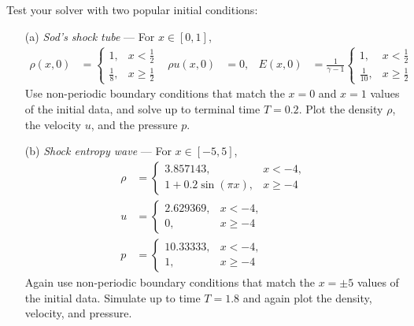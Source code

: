 \documentclass[11pt]{amsart}
\begin{document}
Test your solver with two popular initial conditions:
\begin{itemize}
  \item[(a)] \textit{Sod's shock tube} --- For $x \in [0,1]$,
    {\begin{align*}
      \rho(x,0) &= \left\{ \begin{array}{rl} 1, & x < \frac{1}{2} \\ \frac{1}{8}, & x \geq \frac{1}{2} \end{array}\right. &
        \rho u(x,0) &= 0, &
      E(x,0) &= \frac{1}{\gamma-1}\left\{ \begin{array}{rl} 1, & x < \frac{1}{2} \\ \frac{1}{10}, & x \geq \frac{1}{2} \end{array}\right.
    \end{align*}}
    Use non-periodic boundary conditions that match the $x = 0$ and $x=1$ values of the initial data, and solve up to terminal time $T = 0.2$. Plot the density $\rho$, the velocity $u$, and the pressure $p$.
  \item[(b)] \textit{Shock entropy wave} --- For $x \in [-5, 5]$,
    {\begin{align*}
        \rho &= \left\{ \begin{array}{rl} 3.857143, & x < -4, \\ 1 + 0.2 \sin(\pi x), & x \geq -4 \end{array}\right. \\
        u &= \left\{ \begin{array}{rl} 2.629369, & x < -4, \\ 0, & x \geq -4 \end{array}\right. \\
        p &= \left\{ \begin{array}{rl} 10.33333, & x < -4, \\ 1, & x \geq -4 \end{array}\right.
    \end{align*}}
    Again use non-periodic boundary conditions that match the $x = \pm 5$ values of the initial data. Simulate up to time $T = 1.8$ and again plot the density, velocity, and pressure.
\end{itemize}
\end{document}
